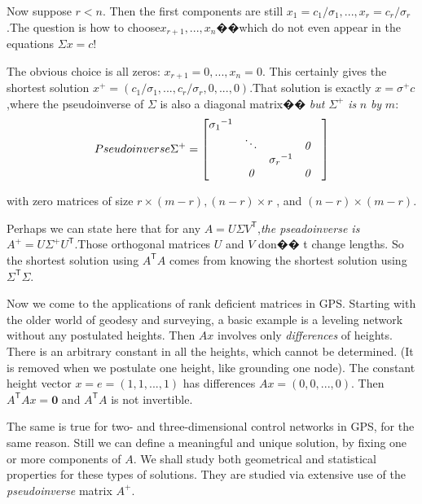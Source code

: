 \par
Now suppose $r < n$. Then the first components are still ${x}_{1} = c_1/\sigma_1 ,...,{x}_{r} = c_r/\sigma_r$.The question is how to choose$x_{r+1},...,x_n$��which do not even appear in the equations $\Sigma x = c$!
\par
The obvious choice is all zeros: $x_{r+1} = 0,...,x_n = 0$. This certainly gives the shortest solution $x^+ = ( c_1 / \sigma_1,...,c_r / \sigma_r,0, ...,0)$.That solution is exactly $x = \sigma^+c$,where the pseudoinverse of $\Sigma$ is also a diagonal matrix�� \emph{but} $\Sigma^+$ \emph{is} $n$ \emph{by} $m$:
\begin{equation}
	Pseudoinverse \Sigma^+ =
	\begin{bmatrix}
		{\sigma_1}^{-1} & & & &\\
		& \ddots & & \emph{0}\\
		&  & {\sigma_r}^{-1} \\
		&  \emph{0} & & \emph{0}
	\end{bmatrix}
\end{equation}
\par \noindent
with zero matrices of size $r \times ( m - r ), (n - r ) \times r$ , and $(n - r ) \times (m - r )$.
\par
Perhaps we can state here that for any $A = U\Sigma V^\mathsf{T}$,\emph{the pseadoinverse is} $A^+ = U\Sigma^+U^\mathsf{T}$.Those orthogonal matrices $U$ and $V$ don�� t change lengths. So the shortest solution using $A^\mathsf{T}A$ comes from knowing the shortest solution using $\Sigma^\mathsf{T}\Sigma$.
\par
Now we come to the applications of rank deficient matrices in GPS. Starting with the older world of geodesy and surveying, a basic example is a leveling network without any postulated heights. Then $Ax$ involves only \emph{differences} of heights. There is an arbitrary constant in all the heights, which cannot be determined. (It is removed when we postulate one height, like grounding one node). The constant height vector $x = e = (1, 1,...,1)$ has differences $Ax = (0,0,...,0)$. Then$A^\mathsf{T}Ax = \mathbf{0}$ and $A^\mathsf{T}A$ is not invertible.
\par
The same is true for two- and three-dimensional control networks in GPS, for the same reason. Still we can define a meaningful and unique solution, by fixing one or more components of $A$. We shall study both geometrical and statistical properties for these types of solutions. They are studied via extensive use of the \emph{pseudoinverse} matrix $A^+$.

